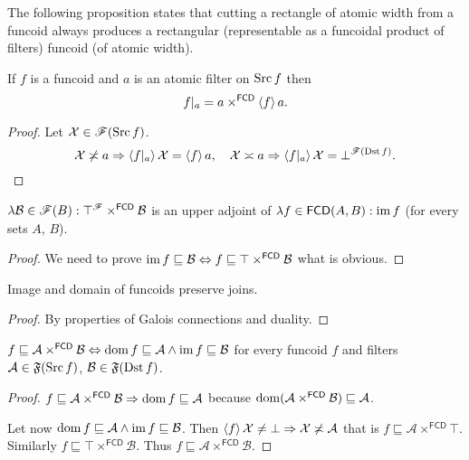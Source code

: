 The following proposition states that cutting a rectangle of atomic
width from a funcoid always produces a rectangular (representable
as a funcoidal product of filters) funcoid (of atomic width).
\begin{prop}
If $f$ is a funcoid and $a$ is an atomic filter on $\operatorname{Src} f$ then
\[
f|_{a}=a\times^{\mathsf{FCD}}\left\langle f\right\rangle a.
\]
\end{prop}
\begin{proof}
Let $\mathcal{X}\in\mathscr{F}(\operatorname{Src} f)$.
\[
\mathcal{X}\not\asymp a\Rightarrow\left\langle f|_{a}\right\rangle\mathcal{X}=\left\langle f\right\rangle a,\quad\mathcal{X}\asymp
a\Rightarrow\left\langle f|_{a}\right\rangle\mathcal{X}=\bot^{\mathscr{F}(\operatorname{Dst} f)}.
\]

\end{proof}

\begin{lem}
$\lambda\mathcal{B}\in\mathscr{F}(B):\top^{\mathscr{F}}\times^{\mathsf{FCD}}
\mathcal{B}$
is an upper adjoint of $\lambda f\in\mathsf{FCD}(A,B):\operatorname{im} f$ (for
every sets $A$, $B$).\end{lem}
\begin{proof}
We need to prove $\operatorname{im} f\sqsubseteq\mathcal{B}\Leftrightarrow
f\sqsubseteq\top\times^{\mathsf{FCD}}\mathcal{B}$
what is obvious.\end{proof}
\begin{cor}
\label{fcd-dom-join}Image and domain of funcoids preserve joins.\end{cor}
\begin{proof}
By properties of Galois connections and duality.\end{proof}
\begin{prop}
$f\sqsubseteq\mathcal{A}\times^{\mathsf{FCD}}\mathcal{B}\Leftrightarrow\operatorname{dom}
f\sqsubseteq\mathcal{A}\wedge\operatorname{im} f\sqsubseteq\mathcal{B}$
for every funcoid $f$ and filters $\mathcal{A}\in\mathfrak{F}(\operatorname{Src} f)$,
$\mathcal{B}\in\mathfrak{F}(\operatorname{Dst} f)$.\end{prop}
\begin{proof}
$f\sqsubseteq\mathcal{A}\times^{\mathsf{FCD}}\mathcal{B}\Rightarrow\operatorname{dom}
f\sqsubseteq\mathcal{A}$
because
$\operatorname{dom}(\mathcal{A}\times^{\mathsf{FCD}}\mathcal{B})\sqsubseteq\mathcal{A}$.

Let now $\operatorname{dom} f\sqsubseteq\mathcal{A}\wedge\operatorname{im} f\sqsubseteq\mathcal{B}$.
Then $\left\langle f\right\rangle\mathcal{X}\neq\bot\Rightarrow\mathcal{X}\not\asymp\mathcal{A}$
that is $f\sqsubseteq\mathcal{A}\times^{\mathsf{FCD}}\top$. Similarly
$f\sqsubseteq\top\times^{\mathsf{FCD}}\mathcal{B}$. Thus
$f\sqsubseteq\mathcal{A}\times^{\mathsf{FCD}}\mathcal{B}$.
\end{proof}

